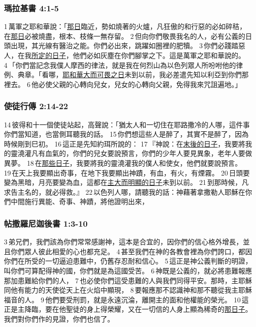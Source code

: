 \subsubsection{瑪拉基書 4:1-5}
1 萬軍之耶和華說：「\underline{那日}臨近，勢如燒著的火爐，凡狂傲的和行惡的必如碎秸，在\underline{那日}必被燒盡，根本、枝條一無存留。 2 但向你們敬畏我名的人，必有公義的日頭出現，其光線有醫治之能。你們必出來，跳躍如圈裡的肥犢。 3 你們必踐踏惡人，在我\underline{所定的日子}，他們必如灰塵在你們腳掌之下。這是萬軍之耶和華說的。4 「你們當記念我僕人摩西的律法，就是我在何烈山為以色列眾人所吩咐他的律例、典章。「看哪，\underline{耶和華大而可畏之日}未到以前，我必差遣先知以利亞到你們那裡去。 6 他必使父親的心轉向兒女，兒女的心轉向父親，免得我來咒詛遍地。」


\subsubsection{使徒行傳 2:14-22}
14 彼得和十一個使徒站起，高聲說：「猶太人和一切住在耶路撒冷的人哪，這件事你們當知道，也當側耳聽我的話。 15 你們想這些人是醉了，其實不是醉了，因為時候剛到巳初。 16 這正是先知約珥所說的： 17 『神說：在\underline{末後的日子}，我要將我的靈澆灌凡有血氣的，你們的兒女要說預言，你們的少年人要見異象，老年人要做異夢。 18 在\underline{那些日子}，我要將我的靈澆灌我的僕人和使女，他們就要說預言。 19 在天上我要顯出奇事，在地下我要顯出神蹟，有血，有火，有煙霧。 20 日頭要變為黑暗，月亮要變為血，這都在\underline{主大而明顯的日子}未到以前。 21 到那時候，凡求告主名的，就必得救。』 22 以色列人哪，請聽我的話：神藉著拿撒勒人耶穌在你們中間施行異能、奇事、神蹟，將他證明出來，


\subsubsection{帖撒羅尼迦後書 1:3-10}
3 弟兄們，我們該為你們常常感謝神，這本是合宜的，因你們的信心格外增長，並且你們眾人彼此相愛的心也都充足。 4 甚至我們在神的各教會裡為你們誇口，都因你們在所受的一切逼迫患難中，仍舊存忍耐和信心。 5 這正是神公義判斷的明證，叫你們可算配得神的國，你們就是為這國受苦。 6 神既是公義的，就必將患難報應那加患難給你們的人， 7 也必使你們這受患難的人與我們同得平安。那時，主耶穌同他有能力的天使從天上在火焰中顯現， 8 要報應那不認識神和那不聽從我主耶穌福音的人。 9 他們要受刑罰，就是永遠沉淪，離開主的面和他權能的榮光。 10 這正是主降臨，要在他聖徒的身上得榮耀，又在一切信的人身上顯為稀奇的\underline{那日子}。我們對你們作的見證，你們也信了。


